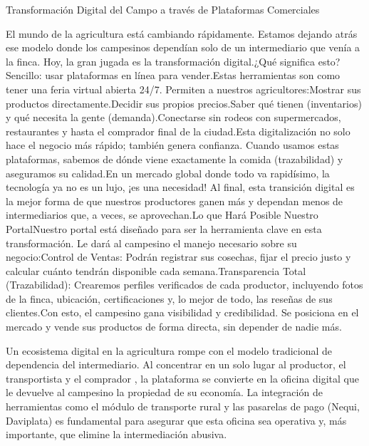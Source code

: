 Transformación Digital del Campo a través de Plataformas Comerciales

El mundo de la agricultura está cambiando rápidamente. Estamos dejando atrás ese modelo donde los campesinos dependían solo de un intermediario que venía a la finca. Hoy, la gran jugada es la transformación digital.¿Qué significa esto? Sencillo: usar plataformas en línea para vender.Estas herramientas son como tener una feria virtual abierta 24/7. Permiten a nuestros agricultores:Mostrar sus productos directamente.Decidir sus propios precios.Saber qué tienen (inventarios) y qué necesita la gente (demanda).Conectarse sin rodeos con supermercados, restaurantes y hasta el comprador final de la ciudad.Esta digitalización no solo hace el negocio más rápido; también genera confianza. Cuando usamos estas plataformas, sabemos de dónde viene exactamente la comida (trazabilidad) y aseguramos su calidad.En un mercado global donde todo va rapidísimo, la tecnología ya no es un lujo, ¡es una necesidad! Al final, esta transición digital es la mejor forma de que nuestros productores ganen más y dependan menos de intermediarios que, a veces, se aprovechan.Lo que Hará Posible Nuestro PortalNuestro portal está diseñado para ser la herramienta clave en esta transformación. Le dará al campesino el manejo necesario sobre su negocio:Control de Ventas: Podrán registrar sus cosechas, fijar el precio justo y calcular cuánto tendrán disponible cada semana.Transparencia Total (Trazabilidad): Crearemos perfiles verificados de cada productor, incluyendo fotos de la finca, ubicación, certificaciones y, lo mejor de todo, las reseñas de sus clientes.Con esto, el campesino gana visibilidad y credibilidad. Se posiciona en el mercado y vende sus productos de forma directa, sin depender de nadie más.

Un ecosistema digital en la agricultura rompe con el modelo tradicional de dependencia del intermediario. Al concentrar en un solo lugar al productor, el transportista y el comprador , la plataforma se convierte en la oficina digital que le devuelve al campesino la propiedad de su economía. La integración de herramientas como el módulo de transporte rural y las pasarelas de pago (Nequi, Daviplata) es fundamental para asegurar que esta oficina sea operativa y, más importante, que elimine la intermediación abusiva.